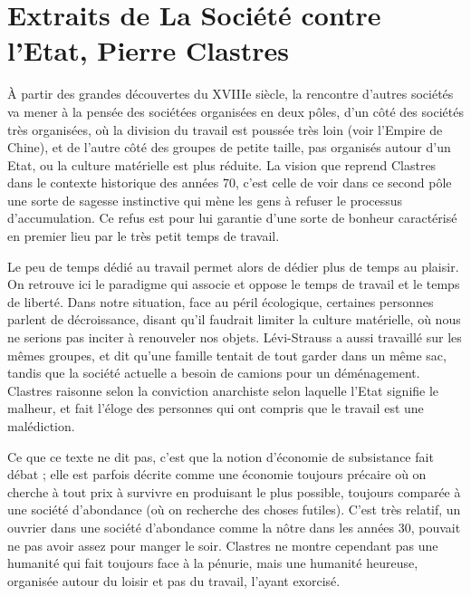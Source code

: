\documentclass[a4paper,12pt]{book}
\begin{document}
\section{Extraits de La Société contre l'Etat, Pierre Clastres}
À partir des grandes découvertes du XVIIIe siècle, la rencontre d'autres sociétés va mener à la pensée des sociétées organisées en deux pôles, d'un côté des sociétés très organisées, où la division du travail est poussée très loin (voir l'Empire de Chine), et de l'autre côté des groupes de petite taille, pas organisés autour d'un Etat, ou la culture matérielle est plus réduite. La vision que reprend Clastres dans le contexte historique des années 70, c'est celle de voir dans ce second pôle une sorte de sagesse instinctive qui mène les gens à refuser le processus d'accumulation. Ce refus est pour lui garantie d'une sorte de bonheur caractérisé en premier lieu par le très petit temps de travail.
\par Le peu de temps dédié au travail permet alors de dédier plus de temps au plaisir. On retrouve ici le paradigme qui associe et oppose le temps de travail et le temps de liberté. Dans notre situation, face au péril écologique, certaines personnes parlent de décroissance, disant qu'il faudrait limiter la culture matérielle, où nous ne serions pas inciter à renouveler nos objets. Lévi-Strauss a aussi travaillé sur les mêmes groupes, et dit qu'une famille tentait de tout garder dans un même sac, tandis que la société actuelle a besoin de camions pour un déménagement. Clastres raisonne selon la conviction anarchiste selon laquelle l'Etat signifie le malheur, et fait l'éloge des personnes qui ont compris que le travail est une malédiction.
\par Ce que ce texte ne dit pas, c'est que la notion d'économie de subsistance fait débat ; elle est parfois décrite comme une économie toujours précaire où on cherche à tout prix à survivre en produisant le plus possible, toujours comparée à une société d'abondance (où on recherche des choses futiles). C'est très relatif, un ouvrier dans une société d'abondance comme la nôtre dans les années 30, pouvait ne pas avoir assez pour manger le soir. Clastres ne montre cependant pas une humanité qui fait toujours face à la pénurie, mais une humanité heureuse, organisée autour du loisir et pas du travail, l'ayant exorcisé.
\end{document}
